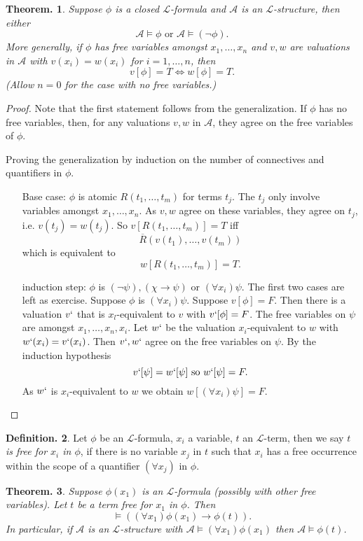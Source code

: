 \documentclass[a4paper,oneside,11pt,DIV=12,parskip=half]{scrartcl}
\newcommand{\LL}{\mathcal L}
\newcommand{\A}{\mathcal A}
\theoremstyle{plain}
\newtheorem{theorem}{Theorem.}[section]
\theoremstyle{definition}
\newtheorem{definition}[theorem]{Definition.}
\newtheorem{remark, definition}[theorem]{Remark and Definition.}
\newtheorem{lemma, definition}[theorem]{Lemma and Definition.}
\newtheorem{theorem, definition}[theorem]{Theorem and Definition.}
\theoremstyle{remark}
\newtheorem*{remark, example}{\textbf{Remark and Exercise}}
\begin{document}
\begin{theorem}
Suppose $\phi$ is a closed $\LL$-formula and $\A$ is an $\LL$-structure, then either $$\A \vDash \phi \text{ or } \A \vDash (\lnot \phi).$$
More generally, if $\phi$ has free variables amongst $x_1, \dots, x_n$ and $v,w$ are valuations in $\A$ with $v(x_i) = w(x_i)$ for $i = 1, \dots,n$, then
    \[ v[\phi] = T \Leftrightarrow w[\phi]=T. \]
    (Allow $n=0$ for the case with no free variables.)
\end{theorem}
\begin{proof}
Note that the first statement follows from the generalization.
If $\phi$ has no free variables, then, for any valuations $v,w$ in $\A$, they agree on the free variables of $\phi$.

Proving the generalization by induction on the number of connectives and quantifiers in $\phi$.
\begin{itemize}
    \item[Base case:] $\phi$ is atomic $R(t_1,\dots,t_m)$ for terms $t_j$. The $t_j$ only involve variables amongst $x_1,\dots,x_n$. As $v,w$ agree on these variables, they agree on $t_j$, i.e. $v(t_j) = w(t_j)$.
    So $v[R(t_1,\dots,t_m)] = T$ iff
    \[ \overline{R}(v(t_1),\dots,v(t_m)) \] which is equivalent to 
    \[ w[R(t_1,\dots,t_m)] = T. \]
    \item[induction step:] $\phi$ is $(\lnot \psi), (\chi \rightarrow \psi)$ or $(\forall x_i) \psi$.
    The first two cases are left as exercise.
    Suppose $\phi$ is $(\forall x_i) \psi$. Suppose $v[\phi] = F$.
    Then there is a valuation $v`$ that is $x_l$-equivalent to $v$ with $v`[\phi] = F$.
    The free variables on $\psi$ are amongst $x_1,\dots,x_n,x_i$. Let $w`$ be the valuation $x_i$-equivalent to $w$ with $w`(x_i) = v`(x_i)$.
    Then $v`,w`$ agree on the free variables on $\psi$. By the induction hypothesis
        \[ v`[\psi] = w`[\psi] \text{ so } w`[\psi] = F. \]
    As $w`$ is $x_i$-equivalent to $w$ we obtain $w[(\forall x_i)\psi] = F$.
\end{itemize}
\end{proof}

\begin{definition}
 Let $\phi$ be an $\LL$-formula, $x_i$ a variable, $t$ an $\LL$-term, then we say \emph{$t$ is free for $x_i$ in $\phi$}, if there is no variable $x_j$ in $t$ such that $x_i$ has a free occurrence within the scope of a quantifier $(\forall x_j)$ in $\phi$. 
\end{definition}

\begin{theorem}
Suppose $\phi(x_1)$ is an $\LL$-formula (possibly with other free variables). Let $t$ be a term free for $x_1$ in $\phi$. Then 
    \[ \vDash ((\forall x_1)\phi(x_1) \rightarrow \phi(t)). \]
In particular, if $\A$ is an $\LL$-structure with $\A \vDash (\forall x_1)\phi(x_1)$ then $\A \vDash \phi(t)$.
\end{theorem}
\end{document}
